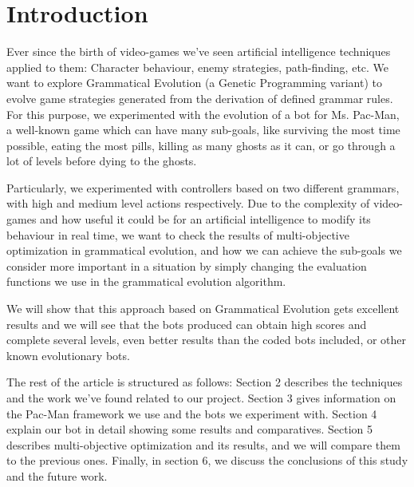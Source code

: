 \documentclass{llncs}
\newcommand{\paco}{Pac-Man }
\begin{document}

%
\section{Introduction}
\label{sec:intro}
%


Ever since the birth of video-games we’ve seen artificial intelligence techniques applied to them: Character behaviour, enemy strategies, path-finding, etc. We want to explore Grammatical Evolution (a Genetic Programming variant) to evolve game strategies generated from the derivation of defined grammar rules. For this purpose, we experimented with the evolution of a bot for Ms. Pac-Man, a well-known game which can have many sub-goals, like surviving the most time possible, eating the most pills, killing as many ghosts as it can, or go through a lot of levels before dying to the ghosts.

Particularly, we experimented with controllers based on two different grammars, with high and medium level actions respectively. Due to the complexity of video-games and how useful it could be for an artificial intelligence to modify its behaviour in real time, we want to check the results of multi-objective optimization in grammatical evolution, and how we can achieve the sub-goals we consider more important in a situation by simply changing the evaluation functions we use in the grammatical evolution algorithm.

We will show that this approach based on Grammatical Evolution gets excellent results and we will see that the bots produced can obtain high scores and complete several levels, even better results than the coded bots included, or other known evolutionary bots.

The rest of the article is structured as follows: Section 2 describes the techniques and the work we’ve found related to our project. Section 3 gives information on the \paco framework we use and the bots we experiment with. Section 4 explain our bot in detail showing some results and comparatives. Section 5 describes multi-objective optimization and its results, and we will compare them to the previous ones. Finally, in section 6, we discuss the conclusions of this study and the future work.
\end{document}
